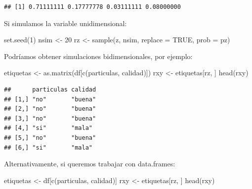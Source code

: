 \documentclass[
]{book}
\newenvironment{Shaded}{\begin{snugshade}}{\end{snugshade}}
\newcommand{\AttributeTok}[1]{\textcolor[rgb]{0.77,0.63,0.00}{#1}}
\newcommand{\ConstantTok}[1]{\textcolor[rgb]{0.00,0.00,0.00}{#1}}
\newcommand{\DecValTok}[1]{\textcolor[rgb]{0.00,0.00,0.81}{#1}}
\newcommand{\FunctionTok}[1]{\textcolor[rgb]{0.00,0.00,0.00}{#1}}
\newcommand{\NormalTok}[1]{#1}
\newcommand{\OtherTok}[1]{\textcolor[rgb]{0.56,0.35,0.01}{#1}}
\newcommand{\StringTok}[1]{\textcolor[rgb]{0.31,0.60,0.02}{#1}}
\theoremstyle{break}
\theoremstyle{nonumberplain}
\begin{document}
\begin{verbatim}
## [1] 0.71111111 0.17777778 0.03111111 0.08000000
\end{verbatim}

Si simulamos la variable unidimensional:

\begin{Shaded}
\begin{Highlighting}[]
\FunctionTok{set.seed}\NormalTok{(}\DecValTok{1}\NormalTok{)}
\NormalTok{nsim }\OtherTok{\textless{}{-}} \DecValTok{20}
\NormalTok{rz }\OtherTok{\textless{}{-}} \FunctionTok{sample}\NormalTok{(z, nsim, }\AttributeTok{replace =} \ConstantTok{TRUE}\NormalTok{, }\AttributeTok{prob =}\NormalTok{ pz)}
\end{Highlighting}
\end{Shaded}

Podríamos obtener simulaciones bidimensionales, por ejemplo:

\begin{Shaded}
\begin{Highlighting}[]
\NormalTok{etiquetas }\OtherTok{\textless{}{-}} \FunctionTok{as.matrix}\NormalTok{(df[}\FunctionTok{c}\NormalTok{(}\StringTok{\textquotesingle{}particulas\textquotesingle{}}\NormalTok{, }\StringTok{\textquotesingle{}calidad\textquotesingle{}}\NormalTok{)])}
\NormalTok{rxy }\OtherTok{\textless{}{-}}\NormalTok{ etiquetas[rz, ]}
\FunctionTok{head}\NormalTok{(rxy)}
\end{Highlighting}
\end{Shaded}

\begin{verbatim}
##      particulas calidad
## [1,] "no"       "buena"
## [2,] "no"       "buena"
## [3,] "no"       "buena"
## [4,] "si"       "mala" 
## [5,] "no"       "buena"
## [6,] "si"       "mala"
\end{verbatim}

Alternativamente, si queremos trabajar con data.frames:

\begin{Shaded}
\begin{Highlighting}[]
\NormalTok{etiquetas }\OtherTok{\textless{}{-}}\NormalTok{ df[}\FunctionTok{c}\NormalTok{(}\StringTok{\textquotesingle{}particulas\textquotesingle{}}\NormalTok{, }\StringTok{\textquotesingle{}calidad\textquotesingle{}}\NormalTok{)]}
\NormalTok{rxy }\OtherTok{\textless{}{-}}\NormalTok{ etiquetas[rz, ]}
\FunctionTok{head}\NormalTok{(rxy)}
\end{Highlighting}
\end{Shaded}
\end{document}
